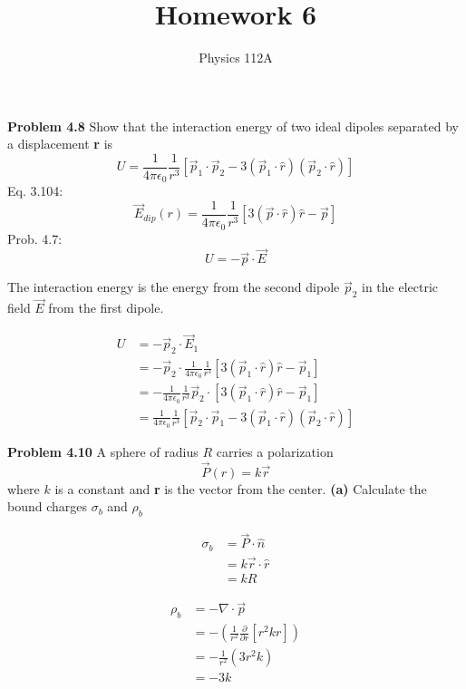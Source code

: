 \documentclass{article}
\title{Homework 6}
\author{Physics 112A}
\date{}
\begin{document}
\maketitle

\textbf{Problem 4.8}
Show that the interaction energy of two ideal dipoles separated by a displacement \textbf{r} is
$$ U = \frac{1}{4 \pi \epsilon_0} \frac{1}{r^3} [ \vec{p}_1 \cdot \vec{p}_2 - 3 ( \vec{p}_1 \cdot \hat{r} ) ( \vec{p}_2 \cdot \hat{r} ) ] $$
Eq. 3.104:
$$ \vec{E}_{dip} (r) = \frac{1}{4 \pi \epsilon_0} \frac{1}{r^3} [ 3 ( \vec{p} \cdot \hat{r} ) \hat{r} - \vec{p} ] $$
Prob. 4.7:
$$ U = - \vec{p} \cdot \vec{E} $$

The interaction energy is the energy from the second dipole $\vec{p}_2$ in the electric field $\vec{E}$ from the first dipole.

\begin{equation*}
\begin{split}
	U & = - \vec{p}_2 \cdot \vec{E}_1 \\
	& = - \vec{p}_2 \cdot \frac{1}{4 \pi \epsilon_0} \frac{1}{r^3} [ 3 ( \vec{p}_1 \cdot \hat{r} ) \hat{r} - \vec{p}_1 ] \\
	& = - \frac{1}{4 \pi \epsilon_0} \frac{1}{r^3} \vec{p}_2 \cdot [ 3 ( \vec{p}_1 \cdot \hat{r} ) \hat{r} - \vec{p}_1 ] \\
	& = \boxed{ \frac{1}{4 \pi \epsilon_0} \frac{1}{r^3} [ \vec{p}_2 \cdot \vec{p}_1 - 3 ( \vec{p}_1 \cdot \hat{r} ) ( \vec{p}_2 \cdot \hat{r} ) ] }
\end{split}
\end{equation*}

\textbf{Problem 4.10}
A sphere of radius $R$ carries a polarization
$$ \vec{P} (r) = k \vec{r} $$
where $k$ is a constant and \textbf{r} is the vector from the center.
\newline
\textbf{(a)}
Calculate the bound charges $\sigma_b$ and $\rho_b$

\begin{equation*}
\begin{split}
	\sigma_b & = \vec{P} \cdot \hat{n} \\
	& = k \vec{r} \cdot \hat{r} \\
	& = \boxed{ kR }
\end{split}
\end{equation*}

\begin{equation*}
\begin{split}
	\rho_b & = - \nabla \cdot \vec{p} \\
	& = - ( \frac{1}{r^2} \frac{\partial }{\partial r} [ r^2 k r ] ) \\
	& = - \frac{1}{r^2} ( 3 r^2 k ) \\
	& = \boxed { -3k }
\end{split}
\end{equation*}
\end{document}
